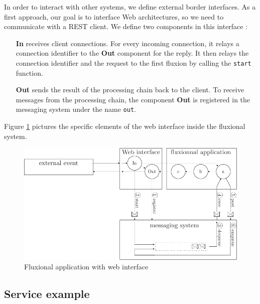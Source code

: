 In order to interact with other systems, we define external border interfaces.
As a first approach, our goal is to interface Web architectures, so we need to communicate with a REST\cite{Fielding2002} client.
We define two components in this interface :

\begin{itemize}
	\item[\textbf{In}]
    receives client connections.
    For every incoming connection, it relays a connection identifier to the \textbf{Out} component for the reply.
    It then relays the connection identifier and the request to the first fluxion by calling the \texttt{start} function.
	\item[\textbf{Out}]
    sends the result of the processing chain back to the client.
    To receive messages from the processing chain, the component \textbf{Out} is registered in the messaging system under the name \texttt{out}.
\end{itemize}

Figure \ref{fig:schemaweb} pictures the specific elements of the web interface inside the fluxional system.

\begin{figure}[h!]
	\includegraphics[width=\linewidth]{ressources/schema-web.pdf}
	\caption{Fluxional application with web interface}
	\label{fig:schemaweb}
\end{figure}


\subsection{Service example}

